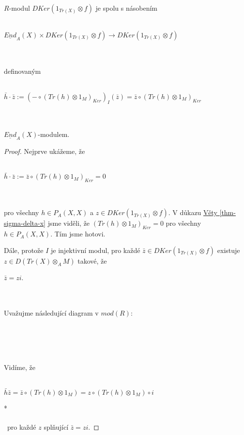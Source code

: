         \begin{lem}
          $R$-modul $DKer(1_{Tr(X)}\otimes f)$ je spolu s násobením \\\\
          \centerline{$\underline{End}_A(X)\times DKer(1_{Tr(X)}\otimes f) \rightarrow DKer(1_{Tr(X)}\otimes f)$} 
          \\\\
          definovaným  \\\\
          \centerline{$\bar{h}\cdot\bar{z}:=(-\circ(Tr(h)\otimes1_M)_{Ker})_I(\bar{z})=\bar{z}\circ(Tr(h)\otimes1_M)_{Ker}$} 
          \\\\
          $\underline{End}_A(X)$-modulem.
        \end{lem}
        \begin{proof}
           Nejprve ukážeme, že \\\\           
           \centerline{$\bar{h}\cdot\bar{z}:=\bar{z}\circ(Tr(h)\otimes1_M)_{Ker}=0$}\\\\
           pro všechny $h\in P_A(X,X)$ a $z\in DKer(1_{Tr(X)}\otimes f)$. V  
           důkazu \hyperref[thm-sigma-delta-x]{Věty \ref*{thm-sigma-delta-x}} 
           jsme viděli, že $(Tr(h)\otimes 1_M)_{Ker}=0$ pro všechny $h\in P_A(X,X)$. 
           Tím jsme hotovi.
           
           Dále, protože $I$ je injektivní modul, pro každé $\bar z\in DKer(1_{Tr(X)}\otimes f)$ 
           existuje $z\in D(Tr(X)\otimes_A M)$ takové, že \\
           \centerline{$\bar z = zi$.}\\\\
           Uvažujme následující diagram v $mod(R)$: \\\\
        \centerline{}\\\\\\
         Vidíme, že \\\\
         \centerline{$\bar h \bar z=\bar z \circ(Tr(h)\otimes 1_M)=z\circ (Tr(h)\otimes 1_M)\circ 
         i$}*\\\\\
         pro každé $z$ splňující $\bar z = zi$.
         

\end{proof}
